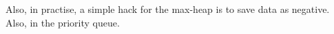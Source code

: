 \documentclass[main.tex]{subfiles}
\begin{document}
Also, in practise, a simple hack for the max-heap is to save data as negative. Also, in the priority queue.
    

\end{document}
